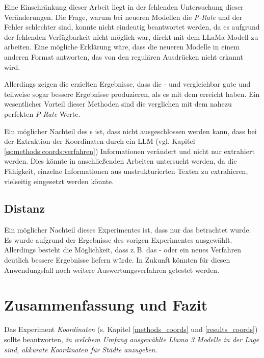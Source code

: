 Eine Einschränkung dieser Arbeit liegt in der fehlenden Untersuchung dieser Veränderungen.
Die Frage, warum bei neueren Modellen die \textit{P-Rate} und der Fehler schlechter sind, konnte nicht eindeutig beantwortet werden, da es aufgrund der fehlenden Verfügbarkeit nicht möglich war, direkt mit dem LLaMa Modell zu arbeiten.
Eine mögliche Erklärung wäre, dass die neueren Modelle in einem anderen Format antworten, das von den regulären Ausdrücken nicht erkannt wird.

Allerdings zeigen die erzielten Ergebnisse, dass die \json{}- und \llmv{} vergleichbar gute und teilweise sogar bessere Ergebnisse produzieren, als \citet{bhandariAreLargeLanguage2023} es mit dem \regexv{} erreicht haben.
Ein wesentlicher Vorteil dieser Methoden sind die verglichen mit dem \regexv{} nahezu perfekten \textit{P-Rate} Werte.

Ein möglicher Nachteil des \llmv{}s ist, dass nicht ausgeschlossen werden kann, dass bei der Extraktion der Koordinaten durch ein LLM (vgl. Kapitel \ref{ss:methods:coords:verfahren}) Informationen verändert und nicht nur extrahiert werden.
Dies könnte in anschließenden Arbeiten untersucht werden, da die Fähigkeit, einzelne Informationen aus unstrukturierten Texten zu extrahieren, vielseitig eingesetzt werden könnte.

\subsection*{Distanz}
Ein möglicher Nachteil dieses Experimentes ist, dass nur das \jsonv{} betrachtet wurde.
Es wurde aufgrund der Ergebnisse des vorigen Experimentes ausgewählt.
Allerdings besteht die Möglichkeit, dass z.\,B. das \llm{}- oder ein neues Verfahren deutlich bessere Ergebnisse liefern würde.
In Zukunft könnten für diesen Anwendungsfall noch weitere Auswertungsverfahren getestet werden.



\section{Zusammenfassung und Fazit}
Das Experiment \textit{Koordinaten} (s. Kapitel \ref{methods_coords} und \ref{results_coords}) sollte beantworten, \textit{in welchem Umfang ausgewählte Llama 3 Modelle in der Lage sind, akkurate Koordinaten für Städte anzugeben}.


